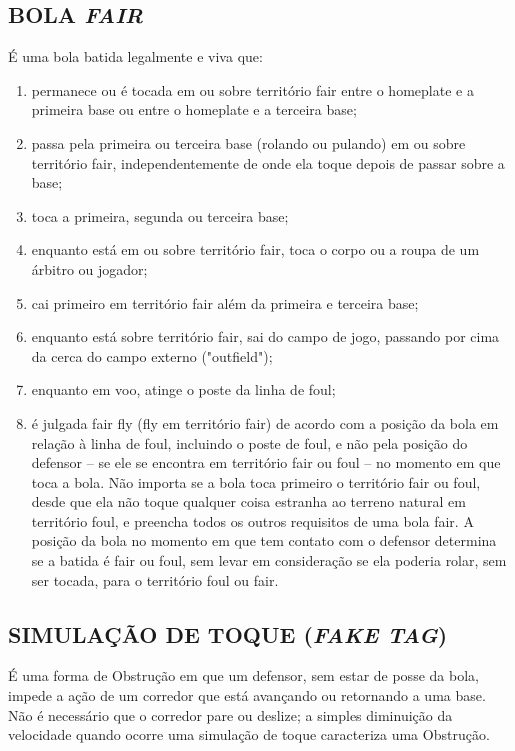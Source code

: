 \subsection{BOLA \textit{FAIR}}
É uma bola batida legalmente e viva que:
\begin{enumerate}[label=(\alph*)]\item   permanece ou é tocada em ou sobre território \gls{fair} entre o \gls{homeplate} e a
	primeira base ou entre o \gls{homeplate} e a terceira base;
	\item  passa pela primeira ou terceira base (rolando ou pulando) em ou sobre território \gls{fair}, independentemente de onde ela toque depois de passar sobre a  base;
	\item  toca a primeira, segunda ou terceira base;
	\item  enquanto está em ou sobre território \gls{fair}, toca o corpo ou a roupa de  um árbitro ou jogador;
	\item  cai primeiro em território \gls{fair} além da primeira e terceira base;
	\item  enquanto está sobre território \gls{fair}, sai do campo de jogo, passando por cima  da cerca do campo externo ("outfield");
	\item   enquanto em voo, atinge o poste da linha de \gls{foul};
	\item   é julgada \gls{fair fly} (\gls{fly} em território \gls{fair}) de acordo com a posição da bola em relação à linha de \gls{foul}, incluindo o poste de \gls{foul}, e não pela posição do defensor -- se ele se encontra em território \gls{fair} ou \gls{foul} -- no momento em que toca a bola. Não importa se a bola toca primeiro o território \gls{fair} ou \gls{foul}, desde que ela não toque qualquer coisa estranha ao terreno natural em território \gls{foul},
	e preencha todos os outros requisitos de uma bola \gls{fair}. A posição da bola no momento em que tem contato com o defensor determina se a batida é \gls{fair} ou
	\gls{foul}, sem levar em consideração se ela poderia rolar, sem ser tocada, para o território \gls{foul} ou \gls{fair}.
\end{enumerate}
\subsection{SIMULAÇÃO DE TOQUE (\textit{FAKE TAG})}
É uma forma de Obstrução em que um defensor, sem estar de posse da bola, impede a ação de um corredor que está avançando ou retornando a uma
base. Não é necessário que o corredor pare ou deslize; a simples diminuição da velocidade quando ocorre uma simulação de toque caracteriza uma  Obstrução.


